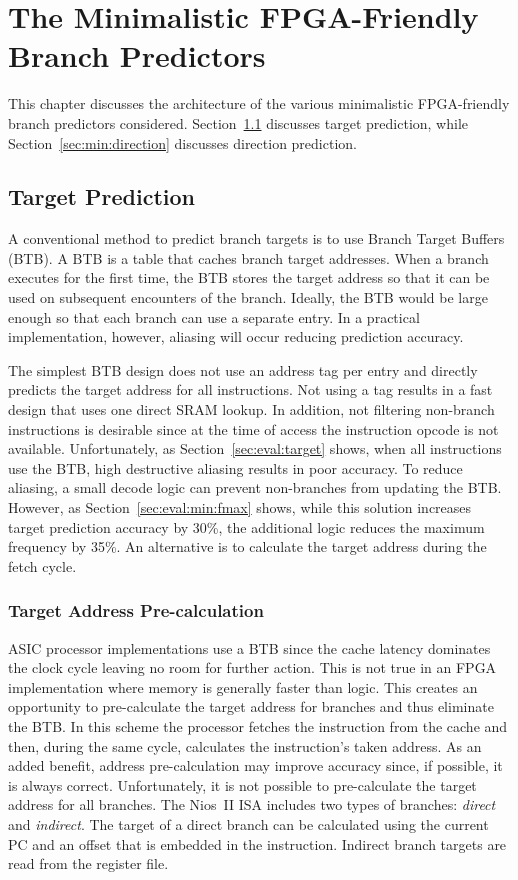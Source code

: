 \chapter{The Minimalistic FPGA-Friendly Branch Predictors}
\label{chap:minimal}
This chapter discusses the architecture of the various minimalistic FPGA-friendly branch predictors considered. Section~\ref{sec:min:target} discusses target prediction, while Section~\ref{sec:min:direction} discusses direction prediction.

\section{Target Prediction}
\label{sec:min:target}
A conventional method to predict branch targets is to use Branch Target Buffers (BTB). A BTB is a table that caches branch target addresses. When a branch executes for the first time, the BTB stores the target address so that it can be used on subsequent encounters of the branch. Ideally, the BTB would be large enough so that each branch can use a separate entry. In a practical implementation, however, aliasing will occur reducing prediction accuracy.  

The simplest BTB design does not use an address tag per entry and directly predicts the target address for all instructions. Not using a tag results in a fast design that uses one direct SRAM lookup. In addition, not filtering non-branch instructions is desirable since at the time of access the instruction opcode is not available. Unfortunately, as Section~\ref{sec:eval:target} shows, when all instructions use the BTB, high destructive aliasing results in poor accuracy. To reduce aliasing, a small decode logic can prevent non-branches from updating the BTB. However, as Section~\ref{sec:eval:min:fmax} shows, while this solution increases target prediction accuracy by 30\%, the additional logic reduces the maximum frequency by 35\%. An alternative is to calculate the target address during the fetch cycle.


\subsection{Target Address Pre-calculation}
\label{sec:min:target:addrprecalc}
ASIC processor implementations use a BTB since the cache latency dominates the clock cycle leaving no room for further action. This is not true in an FPGA implementation where memory is generally faster than logic. This creates an opportunity to pre-calculate the target address for branches and thus eliminate the BTB. In this scheme the processor fetches the instruction from the cache and then, during the same cycle, calculates the instruction's taken address. As an added benefit, address pre-calculation may improve accuracy since, if possible, it is always correct. Unfortunately, it is not possible to pre-calculate the target address for all branches. The Nios~II ISA includes two types of branches: \textit{direct} and \textit{indirect}. The target of a direct branch can be calculated using the current PC and an offset that is embedded in the instruction. Indirect branch targets are read from the register file.  

